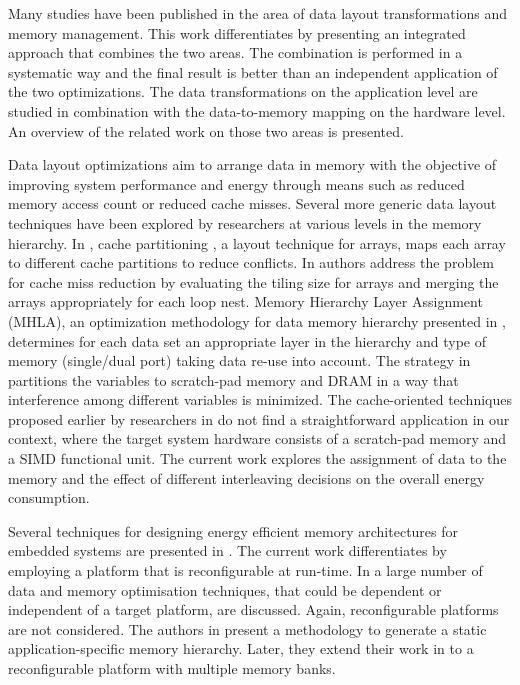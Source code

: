 \documentclass[prodmode,acmtodaes]{acmsmall}
\begin{document}
Many studies have been published in the area of data layout transformations and memory management. 
This work differentiates by presenting an integrated approach that combines the two areas. 
The combination is performed in a systematic way and the final result is better than an independent application of the two optimizations.
The data transformations on the application level are studied in combination with the data-to-memory mapping on the hardware level.
An overview of the related work on those two areas is presented.

Data layout optimizations aim to arrange data in memory with the objective of improving system performance and energy through means such as reduced memory access count or reduced cache misses. 
Several more generic data layout techniques have been explored by researchers at various levels in the memory hierarchy. 
In \cite{4},  cache partitioning , a layout technique for arrays, maps each array to different cache partitions to reduce conflicts. 
In \cite{5} authors address the problem for cache miss reduction by evaluating the tiling size for arrays and merging the arrays appropriately for each loop nest. 
Memory Hierarchy Layer Assignment (MHLA), an optimization methodology for data memory hierarchy presented in \cite{6}, determines for each data set an appropriate layer in the hierarchy and type of memory (single/dual port) taking data re-use into account. 
The strategy in \cite{7} partitions the variables to scratch-pad memory and DRAM in a way that interference among different variables is minimized. 
 The cache-oriented techniques proposed earlier by researchers in \cite{8} do not find a straightforward application in our context, where the target system hardware consists of a scratch-pad memory and a SIMD functional unit.
 The current work explores the assignment of data to the memory and the effect of different interleaving decisions on the overall energy consumption.

Several techniques for designing energy efficient memory architectures for embedded systems are presented in \cite{Mac02}. 
The current work differentiates by employing a platform that is reconfigurable at run-time. 
In \cite{Pgk01} a large number of data and memory optimisation techniques, that could be dependent or independent of a target platform, are discussed. 
Again, reconfigurable platforms are not considered. 
The authors in \cite{Ben00b} present a methodology to generate a static application-specific memory hierarchy. 
Later, they extend their work in \cite{Ben00c} to a reconfigurable platform with multiple memory banks. 
\end{document}
